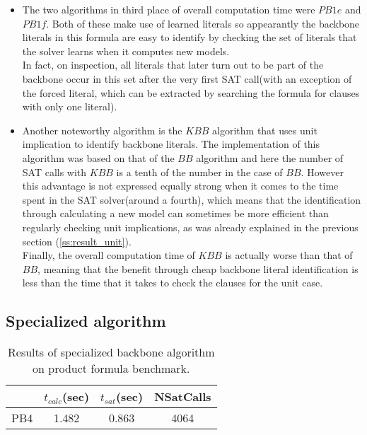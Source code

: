\begin{itemize}
\item The two algorithms in third place of overall computation time were $PB1e$ and $PB1f$. Both of these make use of learned literals so appearantly the backbone literals in this formula are easy to identify by checking the set of literals that the solver learns when it computes new models.\\
In fact, on inspection, all literals that later turn out to be part of the backbone occur in this set after the very first SAT call(with an exception of the forced literal, which can be extracted by searching the formula for clauses with only one literal).
\item Another noteworthy algorithm is the $KBB$ algorithm that uses unit implication to identify backbone literals. The implementation of this algorithm was based on that of the $BB$ algorithm and here the number of SAT calls with $KBB$ is a tenth of the number in the case of $BB$. However this advantage is not expressed equally strong when it comes to the time spent in the SAT solver(around a fourth), which means that the identification through calculating a new model can sometimes be more efficient than regularly checking unit implications, as was already explained in the previous section (\ref{ss:result_unit}).\\
Finally, the overall computation time of $KBB$ is actually worse than that of $BB$, meaning that the benefit through cheap backbone literal identification is less than the time that it takes to check the clauses for the unit case. 
\end{itemize}

\subsection{Specialized algorithm}
\begin{wraptable}[7]{r}{8cm}
\begin{tabular}{l| c c c }
&	$t_{calc}$(sec) &	$t_{sat}$(sec)	& NSatCalls \\
\hline
PB4 & 1.482 & 0.863 & 4064 \\
\end{tabular}
\caption{Results of specialized backbone algorithm on product formula benchmark.}
\label{tab:thoreSpecialResults}
\end{wraptable}

